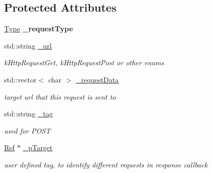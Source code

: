 \subsection*{Protected Attributes}
\begin{DoxyCompactItemize}
\item 
\mbox{\label{classnetwork_1_1HttpRequest_a632381deeb6b78a7742e321433b08605}} 
\hyperlink{classnetwork_1_1HttpRequest_abcc6d7ee2ea91a721d32fd6d396743fe}{Type} {\bfseries \+\_\+request\+Type}
\item 
\mbox{\label{classnetwork_1_1HttpRequest_aabd51d317a3a259afdb2b14e06a58124}} 
std\+::string \hyperlink{classnetwork_1_1HttpRequest_aabd51d317a3a259afdb2b14e06a58124}{\+\_\+url}
\begin{DoxyCompactList}\small\item\em k\+Http\+Request\+Get, k\+Http\+Request\+Post or other enums \end{DoxyCompactList}\item 
\mbox{\label{classnetwork_1_1HttpRequest_ad575ec6662399d734a35ac456a40da91}} 
std\+::vector$<$ char $>$ \hyperlink{classnetwork_1_1HttpRequest_ad575ec6662399d734a35ac456a40da91}{\+\_\+request\+Data}
\begin{DoxyCompactList}\small\item\em target url that this request is sent to \end{DoxyCompactList}\item 
\mbox{\label{classnetwork_1_1HttpRequest_a42bffce54b8aa2a207bb5de697bd48e7}} 
std\+::string \hyperlink{classnetwork_1_1HttpRequest_a42bffce54b8aa2a207bb5de697bd48e7}{\+\_\+tag}
\begin{DoxyCompactList}\small\item\em used for P\+O\+ST \end{DoxyCompactList}\item 
\mbox{\label{classnetwork_1_1HttpRequest_a9719091a92701653976b93dcd686495e}} 
\hyperlink{classRef}{Ref} $\ast$ \hyperlink{classnetwork_1_1HttpRequest_a9719091a92701653976b93dcd686495e}{\+\_\+p\+Target}
\begin{DoxyCompactList}\small\item\em user defined tag, to identify different requests in response callback \end{DoxyCompactList}\item 

\end{DoxyCompactItemize}
